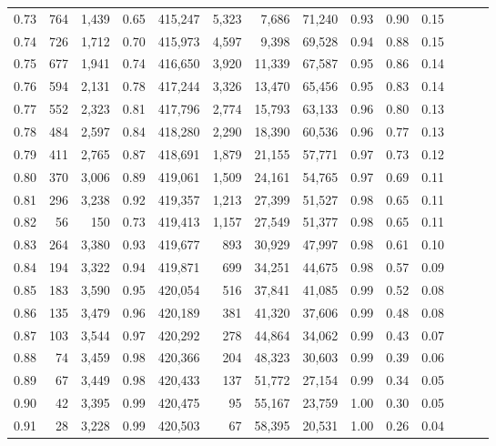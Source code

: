 \begin{tabular}{rrrrrrrrrrrrrr}
0.73 &    764 &  1,439 &  0.65 &  415,247 &    5,323 &   7,686 &  71,240 &  0.93 &  0.90 &      0.15 \\
0.74 &    726 &  1,712 &  0.70 &  415,973 &    4,597 &   9,398 &  69,528 &  0.94 &  0.88 &      0.15 \\
0.75 &    677 &  1,941 &  0.74 &  416,650 &    3,920 &  11,339 &  67,587 &  0.95 &  0.86 &      0.14 \\
0.76 &    594 &  2,131 &  0.78 &  417,244 &    3,326 &  13,470 &  65,456 &  0.95 &  0.83 &      0.14 \\
0.77 &    552 &  2,323 &  0.81 &  417,796 &    2,774 &  15,793 &  63,133 &  0.96 &  0.80 &      0.13 \\
0.78 &    484 &  2,597 &  0.84 &  418,280 &    2,290 &  18,390 &  60,536 &  0.96 &  0.77 &      0.13 \\
0.79 &    411 &  2,765 &  0.87 &  418,691 &    1,879 &  21,155 &  57,771 &  0.97 &  0.73 &      0.12 \\
0.80 &    370 &  3,006 &  0.89 &  419,061 &    1,509 &  24,161 &  54,765 &  0.97 &  0.69 &      0.11 \\
0.81 &    296 &  3,238 &  0.92 &  419,357 &    1,213 &  27,399 &  51,527 &  0.98 &  0.65 &      0.11 \\
0.82 &     56 &    150 &  0.73 &  419,413 &    1,157 &  27,549 &  51,377 &  0.98 &  0.65 &      0.11 \\
0.83 &    264 &  3,380 &  0.93 &  419,677 &      893 &  30,929 &  47,997 &  0.98 &  0.61 &      0.10 \\
0.84 &    194 &  3,322 &  0.94 &  419,871 &      699 &  34,251 &  44,675 &  0.98 &  0.57 &      0.09 \\
0.85 &    183 &  3,590 &  0.95 &  420,054 &      516 &  37,841 &  41,085 &  0.99 &  0.52 &      0.08 \\
0.86 &    135 &  3,479 &  0.96 &  420,189 &      381 &  41,320 &  37,606 &  0.99 &  0.48 &      0.08 \\
0.87 &    103 &  3,544 &  0.97 &  420,292 &      278 &  44,864 &  34,062 &  0.99 &  0.43 &      0.07 \\
0.88 &     74 &  3,459 &  0.98 &  420,366 &      204 &  48,323 &  30,603 &  0.99 &  0.39 &      0.06 \\
0.89 &     67 &  3,449 &  0.98 &  420,433 &      137 &  51,772 &  27,154 &  0.99 &  0.34 &      0.05 \\
0.90 &     42 &  3,395 &  0.99 &  420,475 &       95 &  55,167 &  23,759 &  1.00 &  0.30 &      0.05 \\
0.91 &     28 &  3,228 &  0.99 &  420,503 &       67 &  58,395 &  20,531 &  1.00 &  0.26 &      0.04 \\

\end{tabular}
